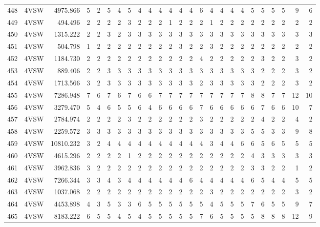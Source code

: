 \documentclass[12pt]{article}\usepackage[]{graphicx}\usepackage[]{color}
\begin{document}
\begin{landscape}
\begin{longtable}[t]{crrrrrrrrrrrrrrrcrrrrrrrr}
448 & 4VSW & 4975.866 & 5 & 2 & 5 & 4 & 5 & 4 & 4 & 4 & 4 & 4 & 4 & 6 & 4 & 4 & 4 & 4 & 5 & 5 & 5 & 5 & 9 & 6\\
449 & 4VSW & 494.496 & 2 & 2 & 2 & 2 & 3 & 2 & 2 & 2 & 1 & 2 & 2 & 2 & 1 & 2 & 2 & 2 & 2 & 2 & 2 & 2 & 2 & 2\\
450 & 4VSW & 1315.222 & 2 & 2 & 3 & 2 & 3 & 3 & 3 & 3 & 3 & 3 & 3 & 3 & 3 & 3 & 3 & 3 & 3 & 3 & 3 & 3 & 3 & 3\\
451 & 4VSW & 504.798 & 1 & 2 & 2 & 2 & 2 & 2 & 2 & 2 & 2 & 3 & 2 & 2 & 3 & 2 & 2 & 2 & 2 & 2 & 2 & 2 & 2 & 2\\
452 & 4VSW & 1184.730 & 2 & 2 & 2 & 2 & 2 & 2 & 2 & 2 & 2 & 2 & 2 & 4 & 2 & 2 & 2 & 2 & 2 & 3 & 2 & 2 & 3 & 2\\
453 & 4VSW & 889.406 & 2 & 2 & 3 & 3 & 3 & 3 & 3 & 3 & 3 & 3 & 3 & 3 & 3 & 3 & 3 & 3 & 3 & 2 & 2 & 2 & 3 & 2\\
454 & 4VSW & 1713.566 & 3 & 2 & 3 & 3 & 3 & 3 & 3 & 3 & 3 & 3 & 3 & 2 & 3 & 3 & 3 & 3 & 3 & 2 & 2 & 2 & 3 & 2\\
455 & 4VSW & 7286.948 & 7 & 6 & 7 & 6 & 7 & 6 & 6 & 7 & 7 & 7 & 7 & 7 & 7 & 7 & 7 & 7 & 8 & 8 & 7 & 7 & 12 & 10\\
456 & 4VSW & 3279.470 & 5 & 4 & 6 & 5 & 5 & 6 & 4 & 6 & 6 & 6 & 6 & 7 & 6 & 6 & 6 & 6 & 6 & 7 & 6 & 6 & 10 & 7\\
457 & 4VSW & 2784.974 & 2 & 2 & 2 & 2 & 3 & 2 & 2 & 2 & 2 & 2 & 2 & 3 & 2 & 2 & 2 & 2 & 2 & 4 & 2 & 2 & 4 & 2\\
458 & 4VSW & 2259.572 & 3 & 3 & 3 & 3 & 3 & 3 & 3 & 3 & 3 & 3 & 3 & 3 & 3 & 3 & 3 & 3 & 5 & 5 & 3 & 3 & 9 & 8\\
459 & 4VSW & 10810.232 & 3 & 2 & 4 & 4 & 4 & 4 & 4 & 4 & 4 & 4 & 4 & 4 & 3 & 4 & 4 & 6 & 6 & 5 & 6 & 5 & 5 & 5\\
460 & 4VSW & 4615.296 & 2 & 2 & 2 & 2 & 1 & 2 & 2 & 2 & 2 & 2 & 2 & 2 & 2 & 2 & 2 & 2 & 4 & 3 & 3 & 3 & 3 & 3\\
461 & 4VSW & 3962.836 & 3 & 2 & 2 & 2 & 2 & 2 & 2 & 2 & 2 & 2 & 2 & 2 & 2 & 2 & 2 & 2 & 3 & 3 & 2 & 2 & 1 & 2\\
462 & 4VSW & 7266.344 & 3 & 3 & 4 & 3 & 4 & 4 & 4 & 4 & 4 & 4 & 6 & 4 & 4 & 4 & 4 & 4 & 6 & 5 & 4 & 4 & 5 & 5\\
463 & 4VSW & 1037.068 & 2 & 2 & 2 & 2 & 2 & 2 & 2 & 2 & 2 & 2 & 2 & 2 & 3 & 2 & 2 & 2 & 2 & 2 & 2 & 2 & 3 & 2\\
464 & 4VSW & 4453.898 & 4 & 3 & 5 & 3 & 3 & 6 & 5 & 5 & 5 & 5 & 5 & 5 & 4 & 5 & 5 & 5 & 7 & 6 & 5 & 5 & 9 & 7\\
465 & 4VSW & 8183.222 & 6 & 5 & 5 & 4 & 5 & 4 & 5 & 5 & 5 & 5 & 5 & 7 & 6 & 5 & 5 & 5 & 5 & 8 & 8 & 8 & 12 & 9\\

\end{longtable}
\end{landscape}
\end{document}
